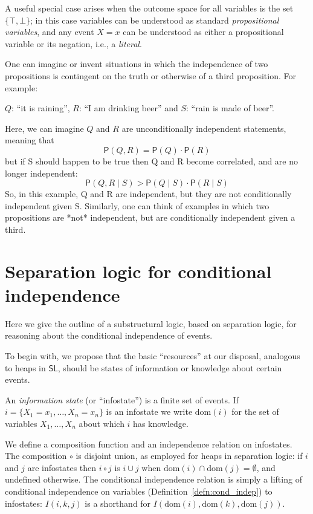 \documentclass[envcountsame,envcountsect]{llncs}
\newcommand{\SL}{\mathsf{SL}}
\newcommand{\dom}[1]{\mathrm{dom}\left(#1\right)}
\newcommand{\false}{\bot}
\newcommand{\true}{\top}
\newcommand{\prob}{\mathsf{P}}
\newcommand{\indep}[3]{I({#1},{#2},{#3})}
\theoremstyle{plain}
\begin{document}
\begin{remark}
A useful special case arises when the outcome space for all variables is the set $\{\true,\false\}$; in this case variables can be understood as standard \emph{propositional variables}, and any event $X=x$ can be understood as either a propositional variable or its negation, i.e., a \emph{literal}.
\end{remark}

\begin{example}
One can imagine or invent situations in which the independence of
two propositions is contingent on the truth or otherwise of a third
proposition. For example:

$Q$: ``it is raining'', $R$: ``I am drinking beer'' and $S$: ``rain is made of beer''.

Here, we can imagine $Q$ and $R$ are unconditionally independent statements, meaning that
\[
\prob(Q, R) = \prob(Q)\cdot \prob(R)
\]
but if S should happen to be true then Q and R become correlated,
and are no longer independent:
\[
\prob(Q, R \mid S) > \prob(Q\mid S)\cdot\prob(R\mid S)
\]
So, in this example, Q and R are independent, but they are not
conditionally independent given S. Similarly, one can think of
examples in which two propositions are *not* independent, but are
conditionally independent given a third.
\end{example}



\section{Separation logic for conditional independence}
\label{sec:logic}

Here we give the outline of a substructural logic, based on separation logic, for reasoning about the conditional independence of events.

To begin with, we propose that the basic ``resources'' at our disposal, analogous to heaps in $\SL$, should be states of information or knowledge about certain events.

\begin{definition}
\label{defn:infostate}
An \emph{information state} (or ``infostate'') is a finite set of events. If $i = \{X_1=x_1,\ldots,X_n=x_n\}$ is an infostate we write $\dom{i}$ for the set of variables $X_1,\ldots,X_n$ about which $i$ has knowledge. 

We define a composition function and an independence relation on infostates. The composition $\circ$ is disjoint union, as employed for heaps in separation logic: if $i$ and $j$ are infostates then $i \circ j$ is $i \cup j$ when $\dom{i} \cap \dom{j} = \emptyset$, and undefined otherwise. The conditional independence relation is simply a lifting of conditional independence on variables (Definition~\ref{defn:cond_indep}) to infostates: $\indep{i}{k}{j}$ is a shorthand for $\indep{\dom{i}}{\dom{k}}{\dom{j}}$.
\end{definition}
\end{document}
